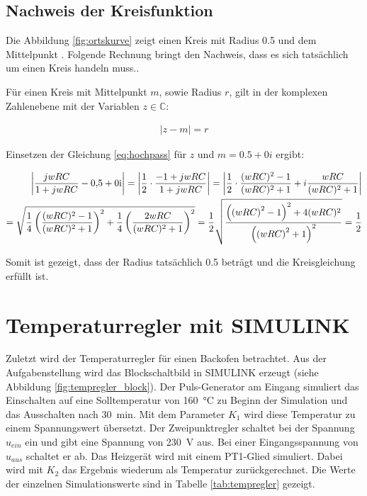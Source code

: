 \documentclass[
    paper=a4,
    fontsize=10pt,
    DIV=12,
    oneside,
]{scrartcl}
\begin{document}
    \subsection{Nachweis der Kreisfunktion}

    Die Abbildung \ref{fig:ortskurve} zeigt einen Kreis mit Radius 0.5 und dem Mittelpunkt . Folgende Rechnung bringt den Nachweis, dass es sich tatsächlich um einen Kreis handeln muss..

    Für einen Kreis mit Mittelpunkt \(m\), sowie Radius \(r\), gilt in der komplexen Zahlenebene mit der Variablen \(z \in \mathbb{C}\):
    
    \begin{align}
        \left| z - m \right| = r
    \end{align}

    Einsetzen der Gleichung \eqref{eq:hochpass} für \(z\) und \(m= 0.5 +0i\) ergibt:

    \begin{align}
        \left|\frac{jwRC}{1+jwRC} - \complexnum{0.5 +0i} \right| = \left| \frac{1}{2} \cdot \frac{-1 + jwRC}{1 + jwRC} \right| = \left| \frac{1}{2} \cdot \frac{(wRC)^2 - 1}{(wRC)^2 + 1} + i \frac{wRC}{(wRC)^2 + 1} \right| \\
        = \sqrt{ \frac{1}{4} \left( \frac{(wRC)^2 - 1}{(wRC)^2 + 1} \right)^2 + \frac{1}{4} \left( \frac{2wRC}{(wRC)^2 + 1} \right)^2} = \frac{1}{2} \sqrt{ \frac{ \left(\left(wRC\right)^2 - 1\right)^2 + 4 (wRC)^2 }{\left(\left(wRC\right)^2 + 1\right)^2} } = \frac{1}{2}
    \end{align}

    Somit ist gezeigt, dass der Radius tatsächlich 0.5 beträgt und die Kreisgleichung erfüllt ist.

\section{Temperaturregler mit SIMULINK}
    Zuletzt wird der Temperaturregler für einen Backofen betrachtet. Aus der Aufgabenstellung \cite{versuch1} wird das Blockschaltbild in SIMULINK erzeugt (siehe Abbildung \ref{fig:tempregler_block}). Der Puls-Generator am Eingang simuliert das Einschalten auf eine Solltemperatur von \SI{160}{\celsius} zu Beginn der Simulation und das Ausschalten nach \SI{30}{\minute}. Mit dem Parameter \(K_1\) wird diese Temperatur zu einem Spannungswert übersetzt. Der Zweipunktregler schaltet bei der Spannung \(u_{ein}\) ein und gibt eine Spannung von \SI{230}{\volt} aus. Bei einer Eingangsspannung von \(u_{aus}\) schaltet er ab. Das Heizgerät wird mit einem PT1-Glied simuliert. Dabei wird mit \(K_2\) das Ergebnis wiederum als Temperatur zurückgerechnet. Die Werte der einzelnen Simulationswerte sind in Tabelle \ref{tab:tempregler} gezeigt. 
\end{document}
